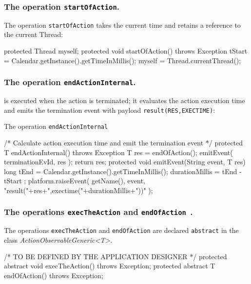 \subsubsection{The operation \texttt{startOfAction}.\\}

The operation \texttt{startOfAction} takes the current time and retains a reference to the current Thread:
\begin{javacode}
protected Thread myself;
	protected void startOfAction() throws Exception{
		tStart = Calendar.getInstance().getTimeInMillis();
		myself = Thread.currentThread();		
	}
\end{javacode}

\subsubsection{The operation \texttt{endActionInternal}.\\}
 is executed when the action is terminated; it evaluates the action execution time and emits the termination event with payload \texttt{result(RES,EXECTIME)}:

The operation \texttt{endActionInternal} 
\begin{javacode}
 	/* Calculate action execution time and emit the termination event */
	protected T endActionInternal() throws Exception{
 		T res = endOfAction();
		emitEvent( terminationEvId, res );
		return res;
	}
	protected void emitEvent(String event, T res){
		long tEnd = Calendar.getInstance().getTimeInMillis();
		durationMillis =  tEnd - tStart ;	
    	platform.raiseEvent( getName(), event, "result("+res+",exectime("+durationMillis+"))" );		
	} 
\end{javacode}

\subsubsection{The operations \texttt{execTheAction} and  \texttt{endOfAction }.\\}
The operations \texttt{execTheAction} and \texttt{endOfAction} are declared \texttt{abstract} in the class \textit{ActionObservableGeneric<T>}. 

\begin{javacode}
	/* TO BE DEFINED BY THE APPLICATION DESIGNER */
	protected abstract void execTheAction() throws Exception; 
	protected abstract T endOfAction() throws Exception; 
\end{javacode}

